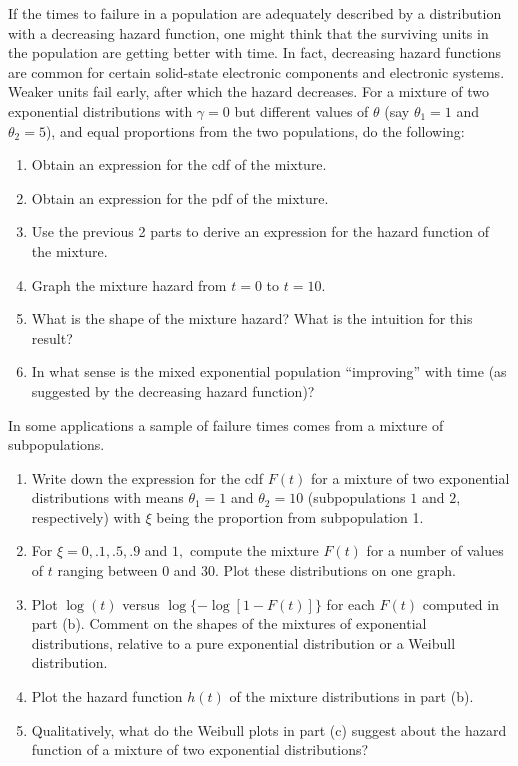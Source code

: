 \begin{exercise}
\label{exercise:simple.mix.exp}
If the times to failure in a population are adequately described by a
distribution with a decreasing hazard function, one might think that the
surviving
units in the population are getting better with time.  In fact,
decreasing hazard functions are common for certain
solid-state electronic components and electronic systems. 
Weaker units fail early, after which the hazard decreases.
For a mixture
of two exponential distributions with $\gamma=0$ but different values
of 
$\theta$ (say $\theta_{1}=1$ and $\theta_{2}=5$), and equal proportions
from the two populations, do the following:
\begin{enumerate}
\item
Obtain an expression for the cdf of the mixture.
\item
Obtain an expression for the pdf of the mixture.
\item
Use the previous 2 parts to derive an expression for the hazard
function  of the mixture.
\item
Graph the mixture hazard from $t=0$  to $t=10$. 
\item
What is the shape of
the mixture hazard? What is the intuition for this result?
\item
In what sense is the mixed exponential population ``improving'' with time (as
suggested by the
decreasing hazard function)?
\end{enumerate}
\end{exercise}

\begin{exercise}
In some applications a sample of failure times comes from
a mixture of subpopulations.
\begin{enumerate}
\item
Write down the expression for the cdf $F(t)$ for a mixture of two
exponential distributions with means $\theta_{1}=1$ and
$\theta_{2}=10$ (subpopulations $1$ and $2,$ respectively) with $\xi$
being the proportion from subpopulation 1.
\item
For $\xi=0, .1, .5, .9$ and $1,$ compute the mixture $F(t)$ for a
number of values of $t$ ranging between $0$ and $30.$ Plot these
distributions on one graph.
\item
Plot  $\log(t)$ versus $\log\{-\log[1-F(t)]\}$  for each $F(t)$ computed
in part (b). Comment on the shapes of the mixtures of exponential
distributions, relative to a pure exponential distribution or a
Weibull distribution.
\item
Plot the hazard function $h(t)$ of the mixture distributions in part (b).
\item
Qualitatively, what do the Weibull plots in part (c) suggest about the
hazard function of a mixture of two exponential distributions?
\end{enumerate}
\end{exercise}

